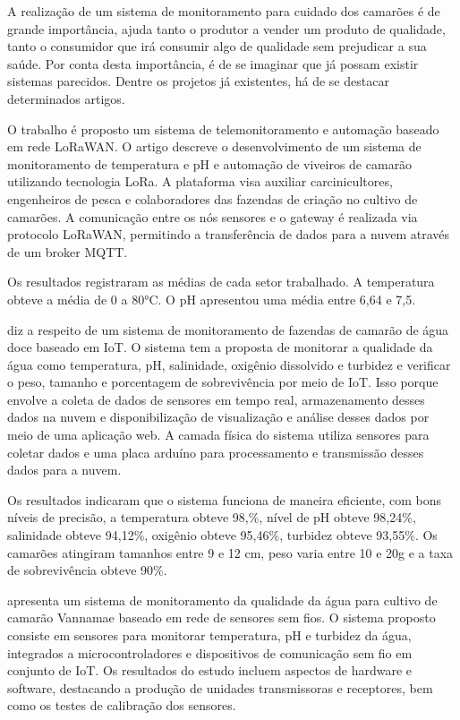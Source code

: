 A realização de um sistema de monitoramento para cuidado dos camarões é de grande importância, ajuda tanto o produtor a vender um produto de qualidade, tanto o consumidor que irá consumir algo de qualidade sem prejudicar a sua saúde. Por conta desta importância, é de se imaginar que já possam existir sistemas parecidos. Dentre os projetos já existentes, há de se destacar determinados artigos.

O trabalho\cite{dantas2020} é proposto um sistema de telemonitoramento e automação baseado em rede LoRaWAN. O artigo descreve o desenvolvimento de um sistema de monitoramento de temperatura e pH e automação de viveiros de camarão utilizando tecnologia LoRa. A plataforma visa auxiliar carcinicultores, engenheiros de pesca e colaboradores das fazendas de criação no cultivo de camarões. A comunicação entre os nós sensores e o gateway é realizada via protocolo LoRaWAN, permitindo a transferência de dados para a nuvem através de um broker MQTT.

Os resultados registraram as médias de cada setor trabalhado. A temperatura obteve a média de 0 a 80°C. O pH apresentou uma média entre 6,64 e 7,5.

\cite{Uddin2020} diz a respeito de um sistema de monitoramento de fazendas de camarão de água doce baseado em IoT. O sistema tem a proposta de monitorar a qualidade da água como temperatura, pH, salinidade, oxigênio dissolvido e turbidez e verificar o peso, tamanho e porcentagem de sobrevivência por meio de IoT. Isso porque envolve a coleta de dados de sensores em tempo real, armazenamento desses dados na nuvem e disponibilização de visualização e análise desses dados por meio de uma aplicação web. A camada física do sistema utiliza sensores para coletar dados e uma placa arduíno para processamento e transmissão desses dados para a nuvem.

Os resultados indicaram que o sistema funciona de maneira eficiente, com bons níveis de precisão, a temperatura obteve 98,\%, nível de pH obteve 98,24\%, salinidade obteve 94,12\%, oxigênio obteve 95,46\%, turbidez obteve 93,55\%. Os camarões atingiram tamanhos entre 9 e 12 cm, peso varia entre 10 e 20g e a taxa de sobrevivência obteve 90\%. 

\cite{Zainuddin2019} apresenta um sistema de monitoramento da qualidade da água para cultivo de camarão Vannamae baseado em rede de sensores sem fios. O sistema proposto consiste em sensores para monitorar temperatura, pH e turbidez da água, integrados a microcontroladores e dispositivos de comunicação sem fio em conjunto de IoT. Os resultados do estudo incluem aspectos de hardware e software, destacando a produção de unidades transmissoras e receptores, bem como os testes de calibração dos sensores.

